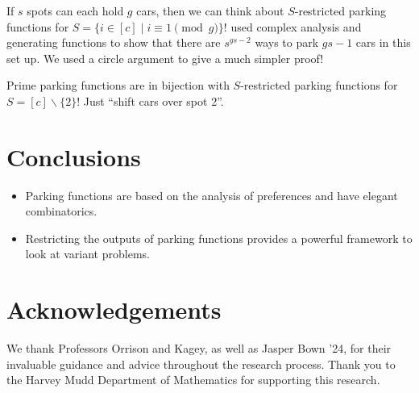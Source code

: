 \documentclass[thesis]{hmcposter}
\begin{document}
\begin{poster}
If $s$ spots can each hold $g$ cars, then we can think about $S$-restricted parking functions for $S = \{ i \in [c] \mid i \equiv 1 \pmod g \}$! \cite{blake-konheim-1977} used complex analysis and generating functions to show that there are $s^{gs - 2}$ ways to park $gs - 1$ cars in this set up. We used a circle argument to give a much simpler proof!

Prime parking functions are in bijection with $S$-restricted parking functions for $S = [c]\backslash\{2\}$! Just ``shift cars over spot 2''.

\section{Conclusions}

\begin{itemize}
    \item Parking functions are based on the analysis of preferences and have elegant combinatorics.
    \item Restricting the outputs of parking functions provides a powerful framework to look at variant problems.
\end{itemize}



\vfill

\section{Acknowledgements}

We thank Professors Orrison and Kagey, as well as Jasper Bown '24, for their invaluable guidance and advice throughout the research process. Thank you to the Harvey Mudd Department of Mathematics for supporting this research.

\vfill
\end{poster}
\end{document}
